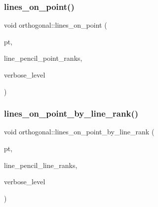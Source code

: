 \subsubsection{\texorpdfstring{lines\+\_\+on\+\_\+point()}{lines\_on\_point()}}
{\footnotesize\ttfamily void orthogonal\+::lines\+\_\+on\+\_\+point (\begin{DoxyParamCaption}\item[{\mbox{\hyperlink{galois_8h_a09fddde158a3a20bd2dcadb609de11dc}{I\+NT}}}]{pt,  }\item[{\mbox{\hyperlink{galois_8h_a09fddde158a3a20bd2dcadb609de11dc}{I\+NT}} $\ast$}]{line\+\_\+pencil\+\_\+point\+\_\+ranks,  }\item[{\mbox{\hyperlink{galois_8h_a09fddde158a3a20bd2dcadb609de11dc}{I\+NT}}}]{verbose\+\_\+level }\end{DoxyParamCaption})}

\mbox{\label{classorthogonal_adc21874b6da3cd3585c704994fb538aa}} 
\subsubsection{\texorpdfstring{lines\+\_\+on\+\_\+point\+\_\+by\+\_\+line\+\_\+rank()}{lines\_on\_point\_by\_line\_rank()}}
{\footnotesize\ttfamily void orthogonal\+::lines\+\_\+on\+\_\+point\+\_\+by\+\_\+line\+\_\+rank (\begin{DoxyParamCaption}\item[{\mbox{\hyperlink{galois_8h_a09fddde158a3a20bd2dcadb609de11dc}{I\+NT}}}]{pt,  }\item[{\mbox{\hyperlink{galois_8h_a09fddde158a3a20bd2dcadb609de11dc}{I\+NT}} $\ast$}]{line\+\_\+pencil\+\_\+line\+\_\+ranks,  }\item[{\mbox{\hyperlink{galois_8h_a09fddde158a3a20bd2dcadb609de11dc}{I\+NT}}}]{verbose\+\_\+level }\end{DoxyParamCaption})}

\mbox{\label{classorthogonal_aa896de1a55608e15b02df00777ac7ccb}} 
